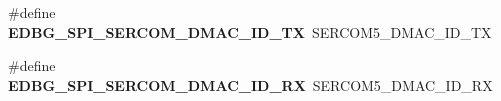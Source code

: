 \begin{DoxyCompactItemize}
\item 
\hypertarget{group__saml21__xplained__pro__features__group_ga7c8df75dc99ab45d5f4ac95121b8e2b4}{}\#define {\bfseries E\+D\+B\+G\+\_\+\+S\+P\+I\+\_\+\+S\+E\+R\+C\+O\+M\+\_\+\+D\+M\+A\+C\+\_\+\+I\+D\+\_\+\+T\+X}~S\+E\+R\+C\+O\+M5\+\_\+\+D\+M\+A\+C\+\_\+\+I\+D\+\_\+\+T\+X\label{group__saml21__xplained__pro__features__group_ga7c8df75dc99ab45d5f4ac95121b8e2b4}

\item 
\hypertarget{group__saml21__xplained__pro__features__group_ga24f7b9591dafc014b6c68f27f45951dc}{}\#define {\bfseries E\+D\+B\+G\+\_\+\+S\+P\+I\+\_\+\+S\+E\+R\+C\+O\+M\+\_\+\+D\+M\+A\+C\+\_\+\+I\+D\+\_\+\+R\+X}~S\+E\+R\+C\+O\+M5\+\_\+\+D\+M\+A\+C\+\_\+\+I\+D\+\_\+\+R\+X\label{group__saml21__xplained__pro__features__group_ga24f7b9591dafc014b6c68f27f45951dc}

\end{DoxyCompactItemize}
